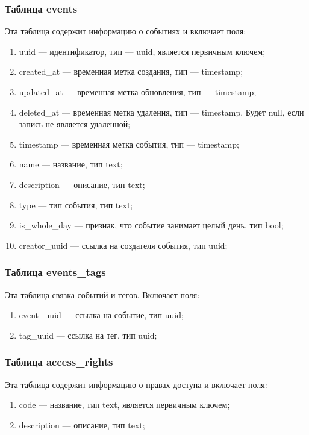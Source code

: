 \subsubsection{Таблица events}

Эта таблица содержит информацию о событиях и включает поля:

\begin{enumerate}[label=\arabic*.]
	\item uuid --- идентификатор, тип --- uuid, является первичным ключем;
	\item created\_at --- временная метка создания, тип --- timestamp;
	\item updated\_at --- временная метка обновления, тип --- timestamp;
	\item deleted\_at --- временная метка удаления, тип --- timestamp. Будет null, если запись не является удаленной;
	\item timestamp --- временная метка события, тип --- timestamp;
	\item name --- название, тип text;
	\item description --- описание, тип text;
	\item type --- тип события, тип text;
	\item is\_whole\_day --- признак, что событие занимает целый день, тип bool;
	\item creator\_uuid --- ссылка на создателя события, тип uuid;
\end{enumerate}

\subsubsection{Таблица events\_tags}

Эта таблица-связка событий и тегов. Включает поля:

\begin{enumerate}[label=\arabic*.]
	\item event\_uuid --- ссылка на событие, тип uuid;
	\item tag\_uuid --- ссылка на тег, тип uuid;
\end{enumerate}

\subsubsection{Таблица access\_rights}

Эта таблица содержит информацию о правах доступа и включает поля:

\begin{enumerate}[label=\arabic*.]
	\item code --- название, тип text, является первичным ключем;
	\item description --- описание, тип text;
\end{enumerate}

